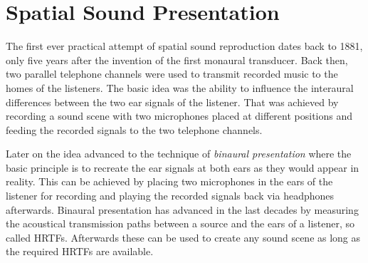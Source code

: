 \documentclass[a4paper]{book}
\newcommand{\reproduce}[1]{%
    \href{#1}{\color{link}\large\Pointinghand}%
}%
\begin{document}
\section{Spatial Sound Presentation}

The first ever practical attempt of spatial sound reproduction dates back to
1881, only five years after the invention of the first monaural transducer.
Back then, two parallel telephone channels were used to transmit recorded
music to the homes of the listeners.\cite{DuMoncel1881a}
The basic idea was the ability to influence the interaural
differences between the two ear signals of the listener. That was achieved by
recording a sound scene with two microphones placed at different positions 
and feeding the recorded signals to the two telephone channels.

Later on the idea advanced to the technique of \emph{binaural presentation} where the basic
principle is to recreate the ear signals at both ears as they would appear in reality.
This can
be achieved by placing two microphones in the ears of the listener for recording and playing the
recorded signals back via headphones afterwards.
Binaural presentation has advanced in the last decades by measuring the
acoustical transmission paths between a source and the ears of a listener, so called
HRTFs. Afterwards these can be used to create any sound scene as long as
the required HRTFs are available.
%
\end{document}
